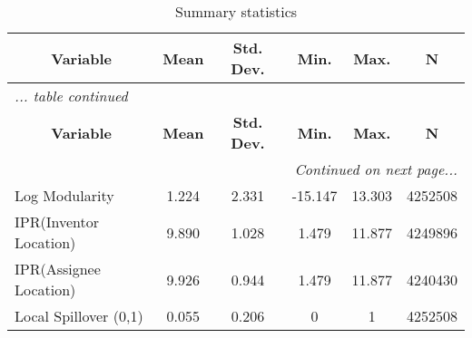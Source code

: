 

\begin{center}
\begin{longtable}{l c c c c c}
\caption{Summary statistics \label{a7}}\\
\hline\hline\multicolumn{1}{c}{\textbf{Variable}}
 &\textbf{Mean}
 & \textbf{Std. Dev.}& \textbf{Min.} &  \textbf{Max.} & \textbf{N} \\ \hline
\endfirsthead
\multicolumn{6}{l}{\emph{... table \thetable{} continued}}
\\ \hline\hline\multicolumn{1}{c}{\textbf{Variable}}
 & \textbf{Mean}
 & \textbf{Std. Dev.}& \textbf{Min.} &  \textbf{Max.} & \textbf{N} \\ \hline
\endhead
\hline
\multicolumn{6}{r}{\emph{Continued on next page...}}\\
\endfoot
\endlastfoot
Log Modularity & 1.224 & 2.331 & -15.147 & 13.303 & 4252508\\
IPR(Inventor Location) & 9.890 & 1.028 & 1.479 & 11.877 & 4249896\\
IPR(Assignee Location) & 9.926 & 0.944 & 1.479 & 11.877 & 4240430\\
Local Spillover (0,1) & 0.055 & 0.206 & 0 & 1 & 4252508\\
\hline\end{longtable}
\end{center}
